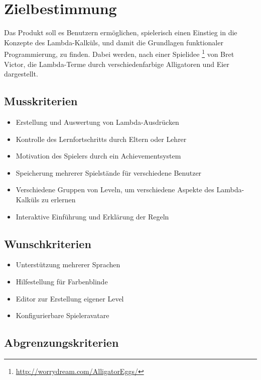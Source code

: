 \section{Zielbestimmung}
Das Produkt soll es Benutzern ermöglichen, spielerisch einen Einstieg in die Konzepte des Lambda-Kalküls, und damit die Grundlagen funktionaler Programmierung, zu finden.
Dabei werden, nach einer Spielidee \footnote{\url{http://worrydream.com/AlligatorEggs/}} von Bret Victor, die Lambda-Terme durch verschiedenfarbige Alligatoren und Eier dargestellt.


\subsection{Musskriterien}

\begin{itemize}
\item Erstellung und Auswertung von Lambda-Ausdrücken
\item Kontrolle des Lernfortschritts durch Eltern oder Lehrer
\item Motivation des Spielers durch ein Achievementsystem
\item Speicherung mehrerer Spielstände für verschiedene Benutzer
\item Verschiedene Gruppen von Leveln, um verschiedene Aspekte des Lambda-Kalküls zu erlernen
\item Interaktive Einführung und Erklärung der Regeln
\end{itemize}


\subsection{Wunschkriterien}

\begin{itemize}
\item Unterstützung mehrerer Sprachen
\item Hilfestellung für Farbenblinde
\item Editor zur Erstellung eigener Level
\item Konfigurierbare Spieleravatare
\end{itemize}


\subsection{Abgrenzungskriterien}
